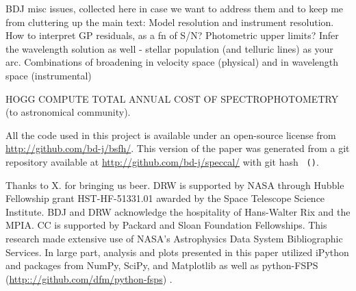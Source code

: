 \documentclass[iop,numberedappendix]{emulateapj}
\begin{document}
BDJ misc issues, collected here in case we want to address them and to
keep me from cluttering up the main text: Model resolution and
instrument resolution.  How to interpret GP residuals, as a fn of S/N?
Photometric upper limits? Infer the wavelength solution as well -
stellar population (and telluric lines) as your arc. Combinations of
broadening in velocity space (physical) and in wavelength space
(instrumental)

HOGG COMPUTE TOTAL ANNUAL COST OF SPECTROPHOTOMETRY (to astronomical community).

All the code used in this project is available under an open-source license
  from \url{http://github.com/bd-j/bsfh/}.
This version of the paper was generated
  from a git repository available at \url{http://github.com/bd-j/speccal/}
  with git hash \texttt{\githash\,(\gitdate)}.

\acknowledgements
Thanks to X. for bringing us beer.
DRW is supported by NASA through Hubble Fellowship grant
  HST-HF-51331.01 awarded by the Space Telescope Science Institute.
BDJ and DRW acknowledge the hospitality of Hans-Walter Rix and the MPIA. 
CC is supported by Packard and Sloan Foundation Fellowships. 
This research made extensive use of NASA's Astrophysics Data System Bibliographic Services. 
In large part, analysis and plots presented in this paper utilized
  iPython and packages from NumPy, SciPy, and Matplotlib
  \citep[][]{hunter2007, oliphant2007, perez2007} as well
  as python-FSPS  (\url{http:://github.com/dfm/python-fsps}) .
\end{document}
